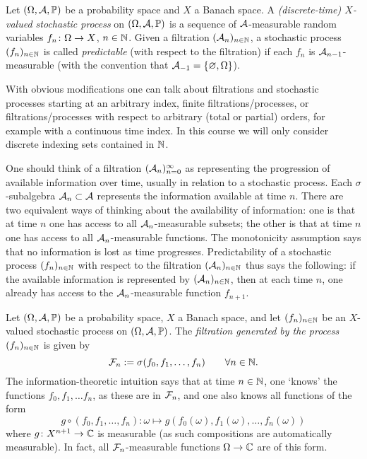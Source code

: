 \begin{defn}
  Let $(\Omega,\mathcal{A},\mathbb{P})$ be a probability space and $X$ a Banach space.
  A \emph{(discrete-time) $X$-valued stochastic process} on $(\Omega,\mathcal{A},\mathbb{P})$ is a sequence of $\mathcal{A}$-measurable random variables $f_n \colon \Omega \rightarrow X$, $n \in \mathbb{N}$.
  Given a filtration $(\mathcal{A}_n)_{n \in \mathbb{N}}$, a stochastic process $(f_n)_{n \in \mathbb{N}}$ is called \emph{predictable} (with respect to the filtration) if each $f_n$ is $\mathcal{A}_{n-1}$-measurable (with the convention that $\mathcal{A}_{-1} = \{\varnothing, \Omega\}$).
\end{defn}

\begin{rmk}
  With obvious modifications one can talk about filtrations and stochastic processes starting at an arbitrary index, finite filtrations/processes, or filtrations/processes with respect to arbitrary (total or partial) orders, for example with a continuous time index.
  In this course we will only consider discrete indexing sets contained in $\mathbb{N}$.
\end{rmk}

One should think of a filtration $(\mathcal{A}_n)_{n=0}^\infty$ as representing the progression of available information over time, usually in relation to a stochastic process.
Each $\sigma$-subalgebra $\mathcal{A}_n \subset \mathcal{A}$ represents the information available at time $n$.
There are two equivalent ways of thinking about the availability of information: one is that at time $n$ one has access to all $\mathcal{A}_n$-measurable subsets; the other is that at time $n$ one has access to all $\mathcal{A}_n$-measurable functions.
The monotonicity assumption says that no information is lost as time progresses.
Predictability of a stochastic process $(f_n)_{n \in \mathbb{N}}$ with respect to the filtration $(\mathcal{A}_n)_{n \in \mathbb{N}}$ thus says the following: if the available information is represented by $(\mathcal{A}_n)_{n \in \mathbb{N}}$, then at each time $n$, one already has access to the $\mathcal{A}_n$-measurable function $f_{n+1}$.

\begin{example}\label{eg:filtration-generated-by-process}
  Let $(\Omega,\mathcal{A},\mathbb{P})$ be a probability space, $X$ a Banach space, and let $(f_n)_{n \in \mathbb{N}}$ be an $X$-valued stochastic process on $(\Omega,\mathcal{A},\mathbb{P})$.
  The \emph{filtration generated by the process $(f_n)_{n \in \mathbb{N}}$} is given by
  \begin{equation*}
    \mathcal{F}_n := \sigma(f_0,f_1,\ldots,f_n) \qquad \forall n \in \mathbb{N}.
  \end{equation*}
  The information-theoretic intuition says that at time $n \in \mathbb{N}$, one `knows' the functions $f_0, f_1, \ldots f_n$, as these are in $\mathcal{F}_n$, and one also knows all functions of the form
  \begin{equation*}
    g \circ (f_0, f_1, \ldots, f_n) \colon \omega \mapsto g(f_0(\omega),f_1(\omega),\ldots,f_n(\omega))
  \end{equation*}
  where $g \colon X^{n+1} \rightarrow \mathbb{C}$ is measurable (as such compositions are automatically measurable).
  In fact, all $\mathcal{F}_n$-measurable functions $\Omega \to \mathbb{C}$ are of this form. %
\end{example}


